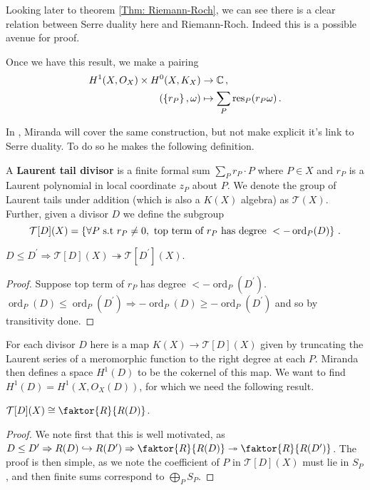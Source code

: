 \documentclass{article}
\begin{document}
\begin{remark}
	Looking later to theorem \ref{Thm: Riemann-Roch}, we can see there is a clear relation between Serre duality here and Riemann-Roch. Indeed this is a possible avenue for proof. 
\end{remark}

Once we have this result, we make a pairing 
\begin{align*}
	H^1(X,O_X) \times H^0(X,K_X) &\to \mathbb{C} \, , \\
	(\left\{ r_P \right\}, \omega) &\mapsto \sum_P \operatorname{res}_P(r_P \omega) \, .
\end{align*}

In \cite{Miranda1995}, Miranda will cover the same construction, but not make explicit it's link to Serre duality. To do so he makes the following definition. 

\begin{definition}
	A \textbf{Laurent tail divisor} is a finite formal sum $\sum_P r_P \cdot P$ where $P\in X$ and $r_P$ is a Laurent polynomial in local coordinate $z_P$ about $P$. We denote the group of Laurent tails under addition (which is also a $K(X)$ algebra) as $\mathcal{T}(X)$. \\
	Further, given a divisor $D$ we define the subgroup 
	\[
	\mathcal{T}[D](X) = \left\{ \forall P \text{ s.t }r_P \neq 0, \text{ top term of $r_P$ has degree }< -\operatorname{ord}_P(D) \right\} \, .
	\]   
\end{definition}

\begin{prop}
	$D \leq D^\prime \Rightarrow \mathcal{T}[D](X) \twoheadrightarrow  \mathcal{T}[D^\prime](X)$. 
\end{prop}
\begin{proof}
	Suppose top term of $r_P$ has degree $< -\operatorname{ord}_P(D^\prime)$. $\operatorname{ord}_P(D) \leq \operatorname{ord}_P(D^\prime) \Rightarrow -\operatorname{ord}_P(D) \geq -\operatorname{ord}_P(D^\prime)$ and so by transitivity done. 
\end{proof}

For each divisor $D$ here is a map $K(X) \to \mathcal{T}[D](X)$ given by truncating the Laurent series of a meromorphic function to the right degree at each $P$. Miranda then defines a space $H^1(D)$ to be the cokernel of this map. We want to find $H^1(D) = H^1(X,O_X(D))$, for which we need the following result.
\begin{lemma}
	$\mathcal{T}[D](X) \cong \faktor{R}{R(D)}$. 
\end{lemma}
\begin{proof}
	We note first that this is well motivated, as $D \leq D^\prime \Rightarrow R(D) \hookrightarrow R(D^\prime) \Rightarrow \faktor{R}{R(D)} \twoheadrightarrow \faktor{R}{R(D^\prime)}$. The proof is then simple, as we note the coefficient of $P$ in $\mathcal{T}[D](X)$ must lie in $S_P$, and then finite sums correspond to $\bigoplus_P S_P$. 
\end{proof}
\end{document}
